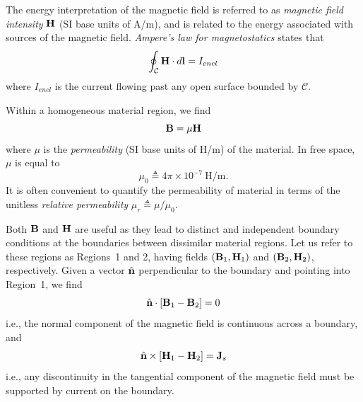 The energy interpretation of the magnetic field is referred to as \emph{magnetic field intensity} 
${\bf H}$ (SI base units of A/m), and is related to the energy associated with sources of the magnetic field.
\emph{Ampere's law for magnetostatics} 
states that
%
\begin{equation}
\oint_{\mathcal{C}} {\bf H}\cdot d{\bf l} = I_{encl}
\label{m0179_mes4}
\end{equation}
%
where $I_{encl}$ is the current flowing past any open surface bounded by $\mathcal{C}$.

Within a homogeneous material region, we find
%
\begin{equation}
{\bf B} = \mu {\bf H}
\label{m0179_eBH}
\end{equation}
%
where $\mu$ is the \emph{permeability} 
(SI base units of H/m) of the material.
In free space, $\mu$ is equal to 
%
\begin{equation}
\mu_0\triangleq 4\pi \times 10^{-7}~\mbox{H/m}.
\end{equation}
%
It is often convenient to quantify the permeability of material in terms of the unitless \emph{relative permeability} 
$\mu_r\triangleq \mu/\mu_0$.

Both ${\bf B}$ and ${\bf H}$ are useful as they lead to distinct and independent boundary conditions 
at the boundaries between dissimilar material regions. 
Let us refer to these regions as Regions~1 and 2, having fields $({\bf B}_1,{\bf H}_1)$ and $({\bf B}_2,{\bf H}_2)$, respectively.  
Given a vector $\hat{\bf n}$ perpendicular to the boundary and pointing into Region~1, we find 
%
%
\begin{equation}
\hat{\bf n}\cdot\left[{\bf B}_1-{\bf B}_2\right] = 0
\end{equation}
%
i.e., the normal component of the magnetic field is continuous across a boundary, and
%
\begin{equation}
\hat{\bf n}\times\left[{\bf H}_1-{\bf H}_2\right] = {\bf J}_s
\end{equation}
%
i.e., any discontinuity in the tangential component of the magnetic field must be supported by current on the boundary. 

